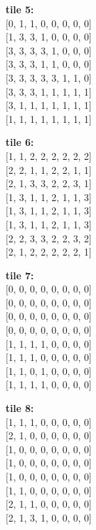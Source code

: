 \documentclass{article}
\begin{document}
\parbox{.20\linewidth}{
\begin{center}
	\textbf{tile 5:} \\[2pt]
  [0, 1, 1, 0, 0, 0, 0, 0] \\[0pt]
  [1, 3, 3, 1, 0, 0, 0, 0] \\[0pt]
  [3, 3, 3, 3, 1, 0, 0, 0] \\[0pt]
  [3, 3, 3, 1, 1, 0, 0, 0] \\[0pt]
  [3, 3, 3, 3, 3, 1, 1, 0] \\[0pt]
  [3, 3, 3, 1, 1, 1, 1, 1] \\[0pt]
  [3, 1, 1, 1, 1, 1, 1, 1] \\[0pt]
  [1, 1, 1, 1, 1, 1, 1, 1] \\[0pt]
\end{center}
}


\parbox{.20\linewidth}{
\begin{center}
	\textbf{tile 6:} \\[2pt]
  [1, 1, 2, 2, 2, 2, 2, 2] \\[0pt]
  [2, 2, 1, 1, 2, 2, 1, 1] \\[0pt]
  [2, 1, 3, 3, 2, 2, 3, 1] \\[0pt]
  [1, 3, 1, 1, 2, 1, 1, 3] \\[0pt]
  [1, 3, 1, 1, 2, 1, 1, 3] \\[0pt]
  [1, 3, 1, 1, 2, 1, 1, 3] \\[0pt]
  [2, 2, 3, 3, 2, 2, 3, 2] \\[0pt]
  [2, 1, 2, 2, 2, 2, 2, 1] \\[0pt]
\end{center}
}
\parbox{.20\linewidth}{
\begin{center}
	\textbf{tile 7:} \\[2pt]
  [0, 0, 0, 0, 0, 0, 0, 0] \\[0pt]
  [0, 0, 0, 0, 0, 0, 0, 0] \\[0pt]
  [0, 0, 0, 0, 0, 0, 0, 0] \\[0pt]
  [0, 0, 0, 0, 0, 0, 0, 0] \\[0pt]
  [1, 1, 1, 1, 0, 0, 0, 0] \\[0pt]
  [1, 1, 1, 0, 0, 0, 0, 0] \\[0pt]
  [1, 1, 0, 1, 0, 0, 0, 0] \\[0pt]
  [1, 1, 1, 1, 0, 0, 0, 0] \\[0pt]
\end{center}
}
\parbox{.20\linewidth}{
\begin{center}
	\textbf{tile 8:} \\[2pt]
  [1, 1, 1, 0, 0, 0, 0, 0] \\[0pt]
  [2, 1, 0, 0, 0, 0, 0, 0] \\[0pt]
  [1, 0, 0, 0, 0, 0, 0, 0] \\[0pt]
  [1, 0, 0, 0, 0, 0, 0, 0] \\[0pt]
  [1, 0, 0, 0, 0, 0, 0, 0] \\[0pt]
  [1, 1, 0, 0, 0, 0, 0, 0] \\[0pt]
  [2, 1, 1, 0, 0, 0, 0, 0] \\[0pt]
  [2, 1, 3, 1, 0, 0, 0, 0] \\[0pt]
\end{center}
}
\end{document}
